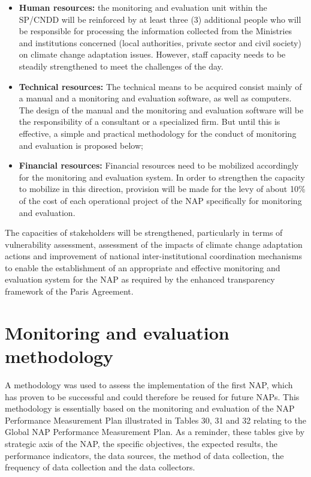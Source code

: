 \documentclass[
]{book}
\begin{document}
\begin{itemize}
\item
  \textbf{Human resources:} the monitoring and evaluation unit within the SP/CNDD will be reinforced by at least three (3) additional people who will be responsible for processing the information collected from the Ministries and institutions concerned (local authorities, private sector and civil society) on climate change adaptation issues. However, staff capacity needs to be steadily strengthened to meet the challenges of the day.
\item
  \textbf{Technical resources:} The technical means to be acquired consist mainly of a manual and a monitoring and evaluation software, as well as computers. The design of the manual and the monitoring and evaluation software will be the responsibility of a consultant or a specialized firm. But until this is effective, a simple and practical methodology for the conduct of monitoring and evaluation is proposed below;
\item
  \textbf{Financial resources:} Financial resources need to be mobilized accordingly for the monitoring and evaluation system. In order to strengthen the capacity to mobilize in this direction, provision will be made for the levy of about 10\% of the cost of each operational project of the NAP specifically for monitoring and evaluation.
\end{itemize}

The capacities of stakeholders will be strengthened, particularly in terms of vulnerability assessment, assessment of the impacts of climate change adaptation actions and improvement of national inter-institutional coordination mechanisms to enable the establishment of an appropriate and effective monitoring and evaluation system for the NAP as required by the enhanced transparency framework of the Paris Agreement.

\section{Monitoring and evaluation methodology}\label{monitoring-and-evaluation-methodology}

A methodology was used to assess the implementation of the first NAP, which has proven to be successful and could therefore be reused for future NAPs. This methodology is essentially based on the monitoring and evaluation of the NAP Performance Measurement Plan illustrated in Tables 30, 31 and 32 relating to the Global NAP Performance Measurement Plan. As a reminder, these tables give by strategic axis of the NAP, the specific objectives, the expected results, the performance indicators, the data sources, the method of data collection, the frequency of data collection and the data collectors.
\end{document}
